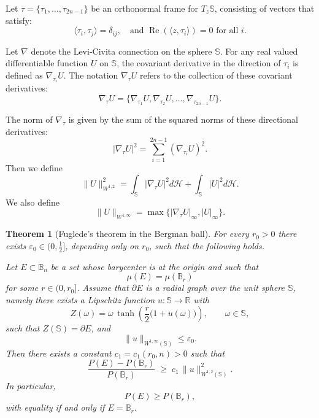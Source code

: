 \documentclass[11pt]{amsart}
\newtheorem{theorem}{Theorem}[section]
\numberwithin{equation}{section}
\def\ge{\geqslant}
\begin{document}
Let $\tau = \{\tau_1, \dots, \tau_{2n-1}\}$ be an orthonormal frame for $T_z \mathbb{S}$, consisting of vectors that satisfy:
\[
\langle \tau_i, \tau_j \rangle = \delta_{ij}, \quad \text{and } \operatorname{Re}(\langle z, \tau_i \rangle) = 0 \text{ for all } i.
\]

Let $\nabla$ denote the Levi-Civita connection on the sphere $\mathbb{S}$. For any real valued differentiable function $U$ on $\mathbb{S}$, the covariant derivative in the direction of $\tau_i$ is defined as $\nabla_{\tau_i} U$. The notation $\nabla_\tau U$ refers to the collection of these covariant derivatives:
\[
\nabla_\tau U = \{ \nabla_{\tau_1} U, \nabla_{\tau_2} U, \dots, \nabla_{\tau_{2n-1}} U \}.
\]

The norm of $\nabla_\tau$ is given by the sum of the squared norms of these directional derivatives:
\[
|\nabla_\tau U|^2 = \sum_{i=1}^{2n-1} (\nabla_{\tau_i} U)^2.
\]
Then we define $$\|U\|^2_{W^{1,2}}=\int_{\mathbb{S}}|\nabla_\tau U|^2 d\mathcal{H} + \int_{\mathbb{S}}|U|^2 d\mathcal{H}.$$ We also define $$\|U\|_{W^{1,\infty}}=\max\{|\nabla_\tau U|_\infty, |U|_\infty\}.$$


\begin{theorem}[Fuglede's theorem in the Bergman ball]\label{mainth}
For every $r_0>0$ there exists $\varepsilon_0\in\bigl(0,\tfrac12\bigr]$, depending only on $r_0$,
such that the following holds.

Let $E\subset \mathbb{B}_n$ be a set whose barycenter is at the origin and such that
\begin{equation}\label{eq:vol_constraint_thm}
\mu(E)=\mu(\mathbb{B}_r)
\end{equation}
for some $r\in(0,r_0]$. Assume that $\partial E$ is a radial graph over the unit sphere
$\mathbb{S}$, namely there exists a Lipschitz function $u:\mathbb{S}\to\mathbb{R}$ with
\begin{equation}\label{eq:graph_param_thm}
Z(\omega)=\omega\,\tanh\!\left(\frac r2\bigl(1+u(\omega)\bigr)\right),\qquad \omega\in\mathbb{S},
\end{equation}
such that $Z(\mathbb{S})=\partial E$, and
\begin{equation}\label{eq:u_small_thm}
\|u\|_{W^{1,\infty}(\mathbb{S})}\le \varepsilon_0.
\end{equation}
Then there exists a constant $c_1=c_1(r_0,n)>0$ such that
\begin{equation}\label{eq:fuglede_estimate}
\frac{P(E)-P(\mathbb{B}_r)}{P(\mathbb{B}_r)}
\;\ge\;
c_1\,\|u\|_{W^{1,2}(\mathbb{S})}^2.
\end{equation} In particular,
\[
P(E)\ge P(\mathbb B_r),
\]
with equality if and only if $E=\mathbb B_r$.
\end{theorem}
\end{document}
